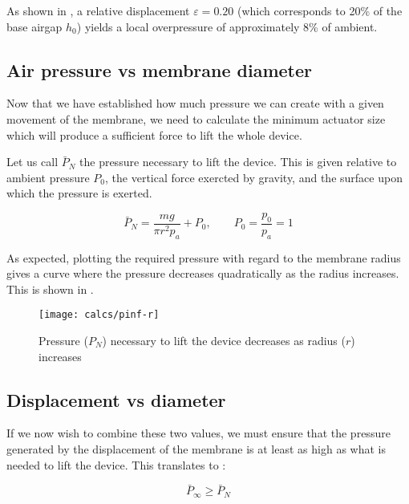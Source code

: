 As shown in , a relative displacement $\varepsilon =
0.20$ (which corresponds to 20\% of the base airgap $h_0$) yields a local
overpressure of approximately 8\% of ambient.

\subsection{Air pressure vs membrane diameter}
\label{sub:pressure-diameter}

Now that we have established how much pressure we can create with a given
movement of the membrane, we need to calculate the minimum actuator size which
will produce a sufficient force to lift the whole device.

Let us call $\bar{P}_N$ the pressure necessary to lift the device. This is given
relative to ambient pressure $P_0$, the vertical force exercted by gravity, and
the surface upon which the pressure is exerted.

\begin{equation}
  \bar{P}_N = \frac{m g}{\pi r^2 p_a} + P_0,
  \quad \quad P_0 = \frac{p_0}{p_a} = 1
  \label{eq:pinf-mg}
\end{equation}

As expected, plotting the required pressure with regard to the membrane radius
gives a curve where the pressure decreases quadratically as the radius
increases. This is shown in .

\begin{figure}[h]
  \begin{center}
    \texttt{[image: calcs/pinf-r]}
  \end{center}
  \caption{Pressure ($P_N$) necessary to lift the device decreases as radius
  ($r$) increases}
  \label{fig:pinf-epsilon}
\end{figure}

\subsection{Displacement vs diameter}
\label{sub:displacement-diameter}

If we now wish to combine these two values, we must ensure that the pressure
generated by the displacement of the membrane is at least as high as what is
needed to lift the device. This translates to :

\begin{equation}
  \bar{P}_\infty \geq \bar{P}_N
  \label{eq:pinfty}
\end{equation}

